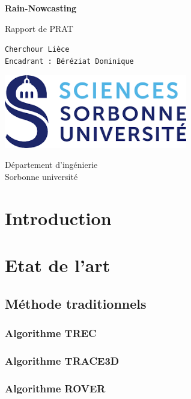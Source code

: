 \documentclass[a4paper]{article}
\begin{document}
\begin{titlepage}
    \begin{center}
            
        \Huge
        \textbf{Rain-Nowcasting}
        
            
        \vspace{0.5cm}
        \LARGE
        Rapport de PRAT
            
        \vspace{1.5cm}
            
        \texttt{Cherchour Lièce} \\ 
        \texttt{Encadrant : Béréziat Dominique}
            
        \vfill
        \vspace{0.8cm}
            
        \includegraphics[width=0.6\textwidth]{assets/sc_uni.png}
            
        \Large
        Département d'ingénierie\\
        Sorbonne université
    \end{center}
\end{titlepage}
\tableofcontents
\newpage
\section{Introduction} %
\section{Etat de l'art}
\subsection{Méthode traditionnels}
\subsubsection{Algorithme TREC}
\subsubsection{Algorithme TRACE3D}
\subsubsection{Algorithme ROVER}
\end{document}
